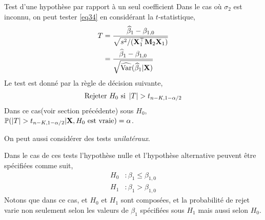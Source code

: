 \begin{frame}[allowframebreaks]{Test d'une hypothèse par rapport à un seul coefficient}
 \medskip
Dans le cas où $\sigma_2$ est inconnu, on peut tester \eqref{eq34} en considérant la 
$t$-statistique,
\begin{align}
T &= \frac{\widehat{\beta}_1 - \beta_{1,0}}{\sqrt{s^2/(\mathbf{X}_1^\top\mathbf{M}_2\mathbf{X}_1)}}\nonumber\\
&=\frac{\widehat{\beta}_1 - \beta_{1,0}}{\sqrt{\widehat{\mathrm{Var}}(\widehat{\beta}_1 | \mathbf{X})}}
\label{eq37}
\end{align}
Le test est donné par la règle de décision suivante,
\begin{align*}
\textrm{Rejeter} \ H_0 \ \textrm{si} \ \left\vert {T} \right\vert > t_{n-K, 1-\alpha/2}
\end{align*}
Dans ce cas(voir section précédente) sous $H_0$, ${\mathbb{P}}( \left\vert {T} \right\vert > t_{n-K, 1-\alpha/2} | \mathbf{X}, H_0 \ \textrm{est vraie}) = \alpha$.

\medskip

On peut aussi considérer des tests \emph{unilatéraux}. 

\medskip

Dans le cas de ces tests l'hypothèse nulle et l'hypothèse alternative peuvent être spécifiées comme suit,
\begin{align*}
H_0 &:  \beta_1 \leq \beta_{1,0}\\
H_1 &:  \beta_1 > \beta_{1,0}
\end{align*}
Notons que dans ce cas, et $H_0$ et $H_1$ sont composées, et la probabilité de rejet varie non seulement selon les valeurs de $\beta_1$ spécifiées sous $H_1$ mais aussi selon $H_0$.


\end{frame}

